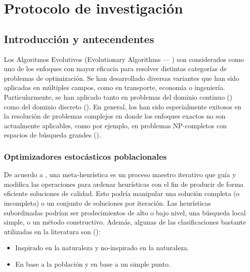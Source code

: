 \chapter{Protocolo de investigación}

\section{Introducción y antecendentes}
Los Algoritmos Evolutivos (Evolutionary Algorithms --- \EAS{}) son considerados como uno de los enfoques con mayor eficacia para resolver distintas categorías de 
problemas de optimización.
%
Se han desarrollado diversas variantes que han sido aplicadas en múltiples campos, como en transporte, economía o ingeniería.
%
Particularmente, se han aplicado tanto en problemas del dominio continuo (\cite{glover2005handbook}) como del dominio discreto (\cite{Joel:Dynamic_FAP}).
%
En general, los \EAS{} han sido especialmente exitosos en la resolución de problemas complejos en donde los enfoques exactos no son actualmente aplicables, como por ejemplo, en problemas NP-completos con espacios de búsqueda grandes (\cite{chakraborty2008advances}).
% 
\subsection{Optimizadores estocásticos poblacionales}

De acuerdo a \cite{voss2012meta}, una meta-heurística es un proceso maestro iterativo que guía y modifica las operaciones para ordenar heurísticas con el fin de producir de forma eficiente soluciones de calidad. 
%
Esto podría manipular una solución completa (o incompleta) o un conjunto de soluciones por iteración.
%
Las heurísticas subordinadas podrían ser prodecimientos de alto o bajo nivel, una búsqueda local simple, o un método constructivo.
%
Además, algunas de las clasificaciones bastante utilizadas en la literatura son (\cite{beheshti2013review}):
\begin{itemize}
    \item Inspirado en la naturaleza y no-inspirado en la naturaleza.
    \item En base a la población y en base a un simple punto.
\end{itemize}

